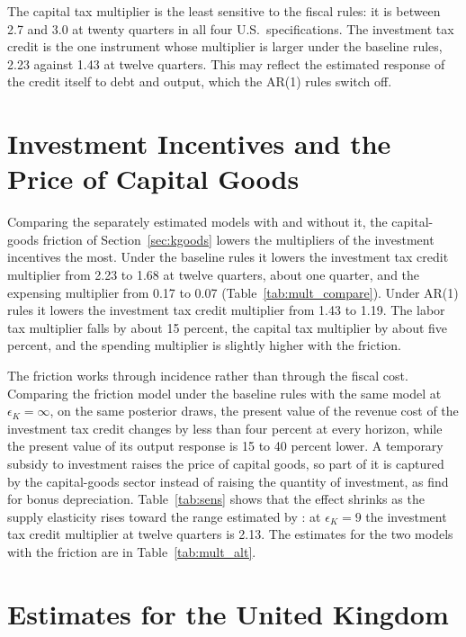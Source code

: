 \documentclass[article,11pt,letterpaper,fleqn]{article}
\theoremstyle{definition}
\numberwithin{equation}{section}
\begin{document}
The capital tax multiplier is the least sensitive to the fiscal rules: it is between 2.7 and 3.0 at twenty quarters in all four U.S.\ specifications. The investment tax credit is the one instrument whose multiplier is larger under the baseline rules, 2.23 against 1.43 at twelve quarters. This may reflect the estimated response of the credit itself to debt and output, which the AR(1) rules switch off.

\section{Investment Incentives and the Price of Capital Goods}
\label{sec:kgoods_results}

Comparing the separately estimated models with and without it, the capital-goods friction of Section~\ref{sec:kgoods} lowers the multipliers of the investment incentives the most. Under the baseline rules it lowers the investment tax credit multiplier from 2.23 to 1.68 at twelve quarters, about one quarter, and the expensing multiplier from 0.17 to 0.07 (Table~\ref{tab:mult_compare}). Under AR(1) rules it lowers the investment tax credit multiplier from 1.43 to 1.19. The labor tax multiplier falls by about 15 percent, the capital tax multiplier by about five percent, and the spending multiplier is slightly higher with the friction.

The friction works through incidence rather than through the fiscal cost. Comparing the friction model under the baseline rules with the same model at $\epsilon_K = \infty$, on the same posterior draws, the present value of the revenue cost of the investment tax credit changes by less than four percent at every horizon, while the present value of its output response is 15 to 40 percent lower. A temporary subsidy to investment raises the price of capital goods, so part of it is captured by the capital-goods sector instead of raising the quantity of investment, as \citet{House_Shapiro_2008} find for bonus depreciation. Table~\ref{tab:sens} shows that the effect shrinks as the supply elasticity rises toward the range estimated by \citet{House_Shapiro_2008}: at $\epsilon_K = 9$ the investment tax credit multiplier at twelve quarters is 2.13. The estimates for the two models with the friction are in Table~\ref{tab:mult_alt}.

\section{Estimates for the United Kingdom}
\label{sec:uk}
\end{document}
